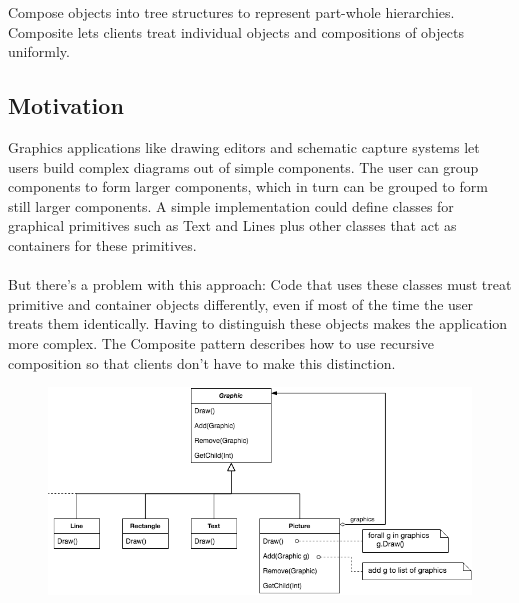 Compose objects into tree structures to represent part-whole hierarchies. Composite lets clients treat individual objects and compositions of objects uniformly.

\subsection*{Motivation}

Graphics applications like drawing editors and schematic capture systems let users build complex diagrams out of simple components. The user can group components to form larger components, which in turn can be grouped to form still larger components. A simple implementation could define classes for graphical primitives such as Text and Lines plus other classes that act as containers for these primitives.
\\\\
But there's a problem with this approach: Code that uses these classes must treat primitive and container objects differently, even if most of the time the user treats them identically. Having to distinguish these objects makes the application more complex. The Composite pattern describes how to use recursive composition so that clients don't have to make this distinction.

\begin{figure}[H]
\centering
\includegraphics[scale=0.5]{diagrams/composite_motivation.png}
\end{figure}

